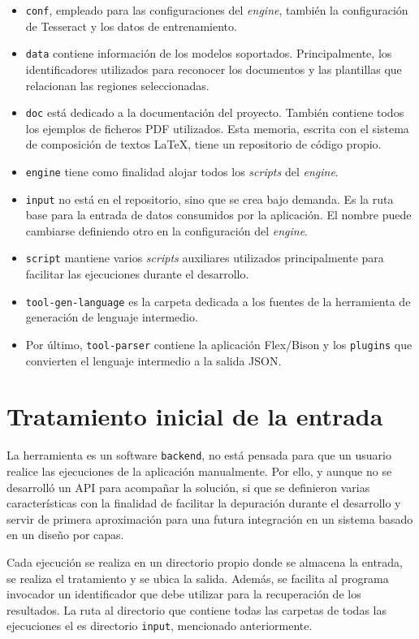\begin{itemize}
    \item \verb|conf|, empleado para las configuraciones del \emph{engine}, también la configuración de Tesseract y los datos de entrenamiento.
    \item \verb|data| contiene información de los modelos soportados. Principalmente, los identificadores utilizados para reconocer los documentos y las plantillas que relacionan las regiones seleccionadas.
    \item \verb|doc| está dedicado a la documentación del proyecto. También contiene todos los ejemplos de ficheros PDF utilizados. Esta memoria, escrita con el sistema de composición de textos \LaTeX,  tiene un repositorio de código propio.
    \item \verb|engine| tiene como finalidad alojar todos los \emph{scripts} del \emph{engine}.
    \item \verb|input| no está en el repositorio, sino que se crea bajo demanda. Es la ruta base para la entrada de datos consumidos por la aplicación. El nombre puede cambiarse definiendo otro en la configuración del \emph{engine}.
    \item \verb|script| mantiene varios \emph{scripts} auxiliares utilizados principalmente para facilitar las ejecuciones durante el desarrollo.
    \item \verb|tool-gen-language| es la carpeta dedicada a los fuentes de la herramienta de generación de lenguaje intermedio.
    \item Por último, \verb|tool-parser| contiene la aplicación Flex/Bison y los \verb|plugins| que convierten el lenguaje intermedio a la salida JSON.
\end{itemize}

\section{Tratamiento inicial de la entrada}

La herramienta es un software \verb|backend|, no está pensada para que un usuario realice las ejecuciones de la aplicación manualmente. Por ello, y aunque no se desarrolló un API para acompañar la solución, si que se definieron varias características con la finalidad de facilitar la depuración durante el desarrollo y servir de primera aproximación para una futura integración en un sistema basado en un diseño por capas.

Cada ejecución se realiza en un directorio propio donde se almacena la entrada, se realiza el tratamiento y se ubica la salida. Además, se facilita al programa invocador un identificador que debe utilizar para la recuperación de los resultados. La ruta al directorio que contiene todas las carpetas de todas las ejecuciones el es directorio \verb|input|, mencionado anteriormente.


